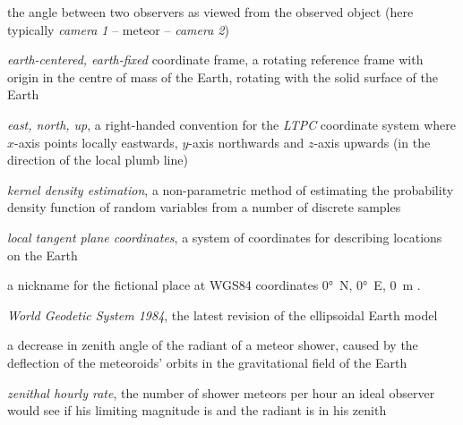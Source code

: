 \begin{description}[labelindent=0mm, leftmargin=40mm]
    \item[convergence angle]
        the angle between two observers as viewed from the observed object (here typically \emph{camera 1} -- meteor -- \emph{camera 2})
    \item[ECEF]
        \emph{earth-centered, earth-fixed} coordinate frame, a rotating reference frame with origin
        in the centre of mass of the Earth, rotating with the solid surface of the Earth
    \item[ENU]
        \emph{east, north, up}, a right-handed convention for the \emph{LTPC} coordinate system where
        $x$-axis points locally eastwards, $y$-axis northwards and $z$-axis upwards
        (in the direction of the local plumb line)
    \item[KDE]
        \emph{kernel density estimation}, a non-parametric method of estimating the probability density function
        of random variables from a number of discrete samples
    \item[LTPC]
        \emph{local tangent plane coordinates}, a system of coordinates for describing locations
        on the Earth 
    \item[Null Island]
        a nickname for the fictional place at WGS84 coordinates \ang{0}~N, \ang{0}~E, \SI{0}{\metre} \citep{null-island}.
    \item[WGS84]
        \emph{World Geodetic System 1984}, the latest revision of the ellipsoidal Earth model \citep{nima-wgs84}
    \item[zenith attraction]
        a decrease in zenith angle of the radiant of a meteor shower, caused by the deflection of the meteoroids' orbits in the
        gravitational field of the Earth \citep{lovell1954}
    \item[ZHR]
        \emph{zenithal hourly rate}, the number of shower meteors per hour an ideal observer would see
            if his limiting magnitude is  and the radiant is in his zenith \citep{imo-glossary}
\end{description}
